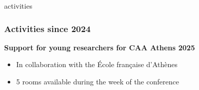 \documentclass[t,aspectratio=169,xcolor=dvipsnames]{beamer}
\begin{document}

\begin{frame}{activities}

    \frametitle{Activities since 2024}

    \begin{block}{\textbf{Support for young researchers for CAA Athens 2025}}
       
        \begin{itemize}
            \item In collaboration with the École française d'Athènes
            \item 5 rooms available during the week of the conference %
        \end{itemize}

    \end{block}

\end{frame}

\end{document}

